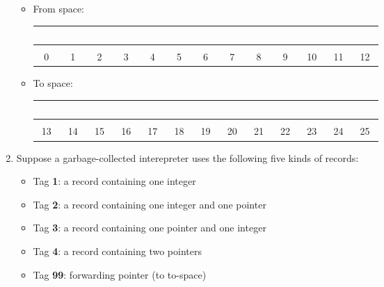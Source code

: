 \begin{enumerate}
\begin{itemize}
 \item From space: \\[10pt]
 {\Huge
 \begin{tabular}{|c|c|c|c|c|c|c|c|c|c|c|c|c|}
  \hline~~~&~~~&~~~&~~~&~~~&~~~&~~~&~~~&~~~&~~~&~~~&~~~&~~~\\
  \hline \multicolumn{1}{c}{}\\[-46pt]
  \multicolumn{1}{c}{\tiny 0}&
  \multicolumn{1}{c}{\tiny 1}&
  \multicolumn{1}{c}{\tiny 2}&
  \multicolumn{1}{c}{\tiny 3}&
  \multicolumn{1}{c}{\tiny 4}&
  \multicolumn{1}{c}{\tiny 5}&
  \multicolumn{1}{c}{\tiny 6}&
  \multicolumn{1}{c}{\tiny 7}&
  \multicolumn{1}{c}{\tiny 8}&
  \multicolumn{1}{c}{\tiny 9}&
  \multicolumn{1}{c}{\tiny 10}&
  \multicolumn{1}{c}{\tiny 11}&
  \multicolumn{1}{c}{\tiny 12}
  \\
 \end{tabular}
 }
 \item To space: \\[10pt]
 {\Huge
 \begin{tabular}{|c|c|c|c|c|c|c|c|c|c|c|c|c|}
  \hline~~~&~~~&~~~&~~~&~~~&~~~&~~~&~~~&~~~&~~~&~~~&~~~&~~~\\
  \hline \multicolumn{1}{c}{}\\[-46pt]
  \multicolumn{1}{c}{\tiny 13}&
  \multicolumn{1}{c}{\tiny 14}&
  \multicolumn{1}{c}{\tiny 15}&
  \multicolumn{1}{c}{\tiny 16}&
  \multicolumn{1}{c}{\tiny 17}&
  \multicolumn{1}{c}{\tiny 18}&
  \multicolumn{1}{c}{\tiny 19}&
  \multicolumn{1}{c}{\tiny 20}&
  \multicolumn{1}{c}{\tiny 21}&
  \multicolumn{1}{c}{\tiny 22}&
  \multicolumn{1}{c}{\tiny 23}&
  \multicolumn{1}{c}{\tiny 24}&
  \multicolumn{1}{c}{\tiny 25}
 \end{tabular}
 }
 \end{itemize}

\item
Suppose a garbage-collected interepreter uses the following five kinds of records:

  \begin{itemize}
  \item Tag \textbf{1}: a record containing one integer
  \item Tag \textbf{2}: a record containing one integer and one pointer
  \item Tag \textbf{3}: a record containing one pointer and one integer
  \item Tag \textbf{4}: a record containing two pointers
  \item Tag \textbf{99}: forwarding pointer (to to-space)
  \end{itemize}


\end{enumerate}
